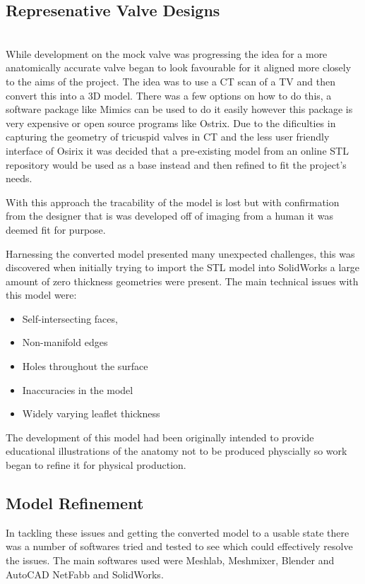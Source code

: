 \subsection{Represenative Valve Designs}

\\
While development on the mock valve was progressing the idea for a more anatomically accurate valve began to look favourable for it aligned more closely to the aims of the project. The idea was to use a \gls{CT} scan of a \gls{TV} and then convert this into a 3D model. There was a few options on how to do this, a software package like Mimics can be used to do it easily however this package is very expensive or open source programs like Ostrix. Due to the dificulties in capturing the geometry of tricuspid valves in \gls{CT} and the less user friendly interface of Osirix it was decided that a pre-existing model from an online STL repository would be used as a base instead and then refined to fit the project's needs.

With this approach the tracability of the model is lost but with confirmation from the designer that is was developed off of imaging from a human it was deemed fit for purpose.

\mynewline
Harnessing the converted model presented many unexpected challenges, this was discovered when initially trying to import the STL model into SolidWorks a large amount of zero thickness geometries were present. The main technical issues with this model were:
\begin{itemize}
    \item Self-intersecting faces,
    \item Non-manifold edges
    \item Holes throughout the surface
    \item Inaccuracies in the model
    \item Widely varying leaflet thickness
\end{itemize}
The development of this model had been originally intended to provide educational illustrations of the anatomy not to be produced physcially so work began to refine it for physical production.

\subsection{Model Refinement}
In tackling these issues and getting the converted model to a usable state there was a number of softwares tried and tested to see which could effectively resolve the issues. The main softwares used were Meshlab, Meshmixer, Blender and AutoCAD NetFabb and SolidWorks.

